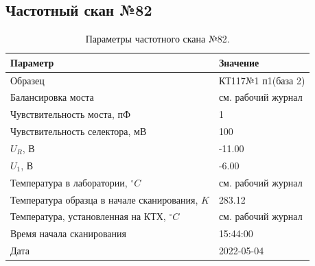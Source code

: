 \subsection{Частотный скан №82}
\begin{table}[!ht]
    \centering
    \caption{Параметры частотного скана №82.}
    \begin{tabular}{|l|l|}
        \hline
        Параметр                                       & Значение                  \\ \hline
        Образец                                        & КТ117№1 п1(база 2)        \\ \hline
        Балансировка моста                             & см. рабочий журнал        \\ \hline
        Чувствительность моста, пФ                     & 1                         \\ \hline
        Чувствительность селектора, мВ                 & 100                       \\ \hline
        $U_R$, В                                       & -11.00                    \\ \hline
        $U_1$, В                                       & -6.00                     \\ \hline
        Температура в лаборатории, $^\circ C$          & см. рабочий журнал        \\ \hline
        Температура образца в начале сканирования, $K$ & 283.12                    \\ \hline
        Температура, установленная на КТХ, $^\circ C$  & см. рабочий журнал        \\ \hline
        Время начала сканирования                      & 15:44:00                  \\ \hline
        Дата                                           & 2022-05-04                \\ \hline
    \end{tabular}
    \label{table:frequency_scan_82}
\end{table}

